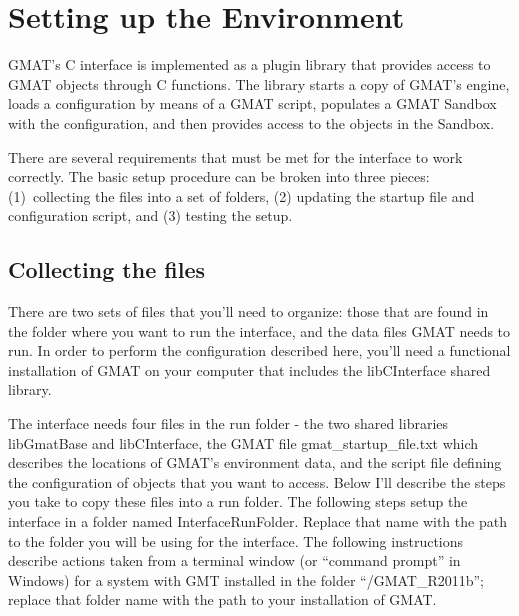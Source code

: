 \documentclass[letterpaper,10pt]{article}
\begin{document}
\section{Setting up the Environment}

GMAT's C interface is implemented as a plugin library that provides access to GMAT objects through C functions.  The library starts a copy of GMAT's engine, loads a configuration by means of a GMAT script, populates a GMAT Sandbox with the configuration, and then provides access to the objects in the Sandbox.

There are several requirements that must be met for the interface to work correctly.  The basic setup procedure can be broken into three pieces: (1)~collecting the files into a set of folders, (2) updating the startup file and configuration script, and (3) testing the setup.

\subsection{Collecting the files}

There are two sets of files that you'll need to organize: those that are found in the folder where you want to run the interface, and the data files GMAT needs to run.  In order to perform the configuration described here, you'll need a functional installation of GMAT on your computer that includes the libCInterface shared library.

The interface needs four files in the run folder - the two shared libraries libGmatBase and libCInterface, the GMAT file gmat\_startup\_file.txt which describes the locations of GMAT's environment data, and the script file defining the configuration of objects that you want to access.  Below I'll describe the steps you take to copy these files into a run folder.  The following steps setup the interface in a folder named InterfaceRunFolder.  Replace that name with the path to the folder you will be using for the interface.  The following instructions describe actions taken from a terminal window (or ``command prompt'' in Windows) for a system with GMT installed in the folder ``/GMAT\_R2011b''; replace that folder name with the path to your installation of GMAT.
\end{document}
